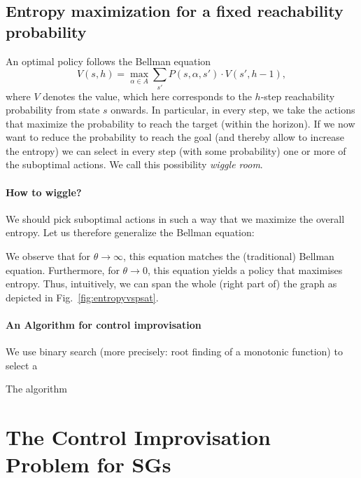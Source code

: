 \documentclass[conference]{IEEEtran}
\theoremstyle{remark}
\newcommand{\act}{\alpha}
\newcommand{\Act}{A}
\begin{document}
\subsection{Entropy maximization for a fixed reachability probability}

An optimal policy follows the Bellman equation
\[ V(s,h)  = \max_{\act \in \Act} \sum_{s'} P(s,\act,s') \cdot V(s',h-1),\]
where $V$ denotes the value, which here corresponds to the $h$-step reachability probability from state $s$ onwards.
In particular, in every step, we take the actions that maximize the probability to reach the target (within the horizon). 
If we now want to reduce the probability to reach the goal (and thereby allow to increase the entropy) we can select in every step (with some probability) one or more of the suboptimal actions. We call this possibility \emph{wiggle room}. 
\paragraph{How to wiggle?}
We should pick suboptimal actions in such a way that we maximize the overall entropy. Let us therefore generalize the Bellman equation:

We observe that for $\theta \rightarrow \infty$, this equation matches the (traditional) Bellman equation. 
Furthermore, for $\theta \rightarrow 0$, this equation yields a policy that maximises entropy.
Thus, intuitively, we can span the whole (right part of) the graph as depicted in Fig.~\ref{fig:entropyvspsat}.


\paragraph{An Algorithm for control improvisation}

We use binary search (more precisely: root finding of a monotonic function) to select a 

The algorithm 




 

\section{The Control Improvisation Problem for SGs}
\end{document}
